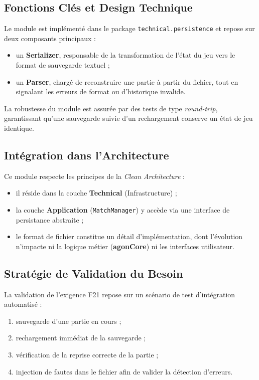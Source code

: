 \documentclass[9pt]{extarticle} %
\begin{document}
\subsection{Fonctions Clés et Design Technique}
Le module est implémenté dans le package \texttt{technical.persistence} et repose sur
deux composants principaux :
\begin{itemize}
    \item un \textbf{Serializer}, responsable de la transformation de l’état du jeu vers
    le format de sauvegarde textuel ;
    \item un \textbf{Parser}, chargé de reconstruire une partie à partir du fichier,
    tout en signalant les erreurs de format ou d’historique invalide.
\end{itemize}

La robustesse du module est assurée par des tests de type \textit{round-trip},
garantissant qu’une sauvegarde suivie d’un rechargement conserve un état de jeu identique.

\subsection{Intégration dans l’Architecture}
Ce module respecte les principes de la \textit{Clean Architecture} :
\begin{itemize}
    \item il réside dans la couche \textbf{Technical} (Infrastructure) ;
    \item la couche \textbf{Application} (\texttt{MatchManager}) y accède via
    une interface de persistance abstraite ;
    \item le format de fichier constitue un détail d’implémentation, dont l’évolution
    n’impacte ni la logique métier (\textbf{agonCore}) ni les interfaces utilisateur.
\end{itemize}

\subsection{Stratégie de Validation du Besoin}
La validation de l’exigence F21 repose sur un scénario de test d’intégration automatisé :
\begin{enumerate}
    \item sauvegarde d’une partie en cours ;
    \item rechargement immédiat de la sauvegarde ;
    \item vérification de la reprise correcte de la partie ;
    \item injection de fautes dans le fichier afin de valider la détection d’erreurs.
\end{enumerate}
\end{document}
